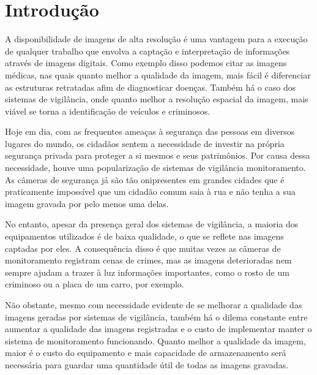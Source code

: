 \documentclass[12pt,openright,oneside,a4paper,english,brazil]{abntex2}
\begin{document}
\textual

\chapter[Introdução]{Introdução}

A disponibilidade de imagens de alta resolução é uma vantagem para a execução de qualquer trabalho que envolva a captação e interpretação de informações através de imagens digitais.
Como exemplo disso podemos citar as imagens médicas, nas quais quanto melhor a qualidade da imagem, mais fácil é diferenciar as estruturas retratadas afim de diagnosticar doenças.
Também há o caso dos sistemas de vigilância, onde quanto melhor a resolução espacial da imagem, mais viável se torna a identificação de veículos e criminosos.

Hoje em dia, com as frequentes ameaças à segurança das pessoas em diversos lugares do mundo, os cidadãos sentem a necessidade de investir na própria segurança privada para proteger a si mesmos e seus patrimônios.
Por causa dessa necessidade, houve uma popularização de sistemas de vigilância monitoramento.
As câmeras de segurança já são tão onipresentes em grandes cidades que é praticamente impossível que um cidadão comum saia à rua e não tenha a sua imagem gravada por pelo menos uma delas.

No entanto, apesar da presença geral dos sistemas de vigilância, a maioria dos equipamentos utilizados é de baixa qualidade, o que se reflete nas imagens captadas por eles.
A consequência disso é que muitas vezes as câmeras de monitoramento registram cenas de crimes,
mas as imagens deterioradas nem sempre ajudam a trazer à luz informações importantes, como o rosto de um criminoso ou a placa de um carro, por exemplo.

Não obstante, mesmo com necessidade evidente de se melhorar a qualidade das imagens geradas por sistemas de vigilância,
também há o dilema constante entre aumentar a qualidade das imagens registradas e o custo de implementar manter o sistema de monitoramento funcionando.
Quanto melhor a qualidade da imagem, maior é o custo do equipamento e mais capacidade de armazenamento será necessária para guardar uma quantidade útil de todas as imagens gravadas.
\end{document}
